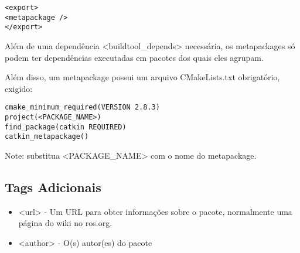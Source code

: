 \begin{verbatim}
<export>
<metapackage />
</export>
\end{verbatim}


Além de uma dependência <buildtool\_depends> necessária, os metapackages só podem ter dependências executadas em pacotes dos quais eles agrupam.

Além disso, um metapackage possui um arquivo CMakeLists.txt obrigatório, exigido:

\begin{verbatim}
cmake_minimum_required(VERSION 2.8.3)
project(<PACKAGE_NAME>)
find_package(catkin REQUIRED)
catkin_metapackage()
\end{verbatim}

Note: substitua <PACKAGE\_NAME> com o nome do metapackage. 

\subsection{Tags Adicionais}

\begin{itemize}
	\setlength{\itemsep}{1pt}
	\setlength{\parskip}{0pt}
	\setlength{\parsep}{0pt}
	\item <url> - Um URL para obter informações sobre o pacote, normalmente uma página do wiki no ros.org.
	\item <author> - O(s) autor(es) do pacote 
\end{itemize}